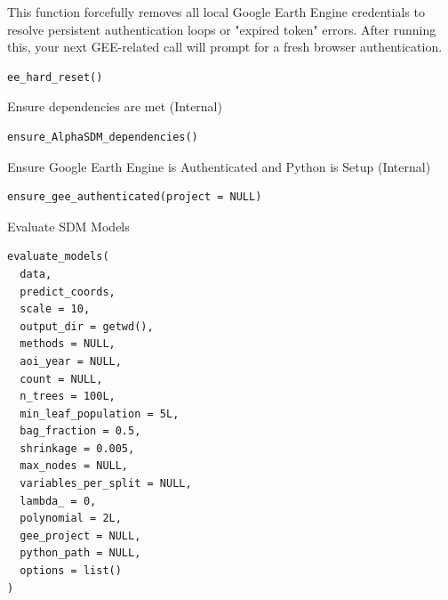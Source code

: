 \documentclass[letterpaper]{book}
\begin{document}
%
\begin{Description}
This function forcefully removes all local Google Earth Engine credentials
to resolve persistent authentication loops or "expired token" errors.
After running this, your next GEE-related call will prompt for a fresh browser authentication.
\end{Description}
%
\begin{Usage}
\begin{verbatim}
ee_hard_reset()
\end{verbatim}
\end{Usage}
%
\begin{Description}
Ensure dependencies are met (Internal)
\end{Description}
%
\begin{Usage}
\begin{verbatim}
ensure_AlphaSDM_dependencies()
\end{verbatim}
\end{Usage}
%
\begin{Description}
Ensure Google Earth Engine is Authenticated and Python is Setup (Internal)
\end{Description}
%
\begin{Usage}
\begin{verbatim}
ensure_gee_authenticated(project = NULL)
\end{verbatim}
\end{Usage}
%
\begin{Description}
Evaluate SDM Models
\end{Description}
%
\begin{Usage}
\begin{verbatim}
evaluate_models(
  data,
  predict_coords,
  scale = 10,
  output_dir = getwd(),
  methods = NULL,
  aoi_year = NULL,
  count = NULL,
  n_trees = 100L,
  min_leaf_population = 5L,
  bag_fraction = 0.5,
  shrinkage = 0.005,
  max_nodes = NULL,
  variables_per_split = NULL,
  lambda_ = 0,
  polynomial = 2L,
  gee_project = NULL,
  python_path = NULL,
  options = list()
)
\end{verbatim}
\end{Usage}
\end{document}
